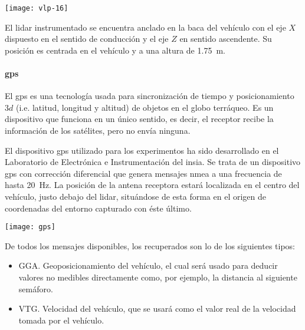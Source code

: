 \begin{marginfigure}
	\texttt{[image: vlp-16]}
	\caption[\acrshort{lidar} modelo VLP-$16$ de empresa Velodyne]{El \acrshort{lidar} VLP-16 de Velodyne tiene un FOV horizontal de \SI{360}{\degree} y vertical de \SI{\pm15}{\degree}, permitiendo una captura de todo el entorno circundante a una frecuencia de hasta \SI{20}{\Hz}. Fuente: \url{http://velodynelidar.com/vlp-16.html}.}
	\label{fig:vlp-16}
\end{marginfigure}

El \acrshort{lidar} instrumentado se encuentra anclado en la baca del vehículo con el eje $X$ dispuesto en el sentido de conducción y el eje $Z$ en sentido ascendente. Su posición es centrada en el vehículo y a una altura de \SI{1.75}{\meter}.

\paragraph{\Acrshort{gps}}

El \Acrshort{gps} es una tecnología usada para sincronización de tiempo y posicionamiento $3d$ (i.e. latitud, longitud y altitud) de objetos en el globo terráqueo. Es un dispositivo que funciona en un único sentido, es decir, el receptor recibe la información de los satélites, pero no envía ninguna.

El dispositivo \Acrshort{gps} utilizado para los experimentos ha sido desarrollado en el Laboratorio de Electrónica e Instrumentación del \ac{insia}. Se trata de un dispositivo \Acrshort{gps} con corrección diferencial que genera mensajes \ac{nmea} a una frecuencia de hasta \SI{20}{\Hz}. La posición de la antena receptora estará localizada en el centro del vehículo, justo debajo del \acrshort{lidar}, situándose de esta forma en el origen de coordenadas del entorno capturado con éste último.

\begin{marginfigure}
	\centering
	\texttt{[image: gps]}
	\caption[Posicionamiento \Acrshort{gps} sobre la tierra]{El \Acrshort{gps} permite el posicionamiento 3d sobre en la tierra gracias a la comunicación unidireccional de satélites situados en órbita. Fuente: Wikimedia Commons.}
	\label{fig:gps}
\end{marginfigure}

De todos los mensajes disponibles, los recuperados son lo de los siguientes tipos:

\begin{itemize}
	\item GGA. Geoposicionamiento del vehículo, el cual será usado para deducir valores no medibles directamente como, por ejemplo, la distancia al siguiente semáforo.
	\item VTG. Velocidad del vehículo, que se usará como el valor real de la velocidad tomada por el vehículo.
\end{itemize}

